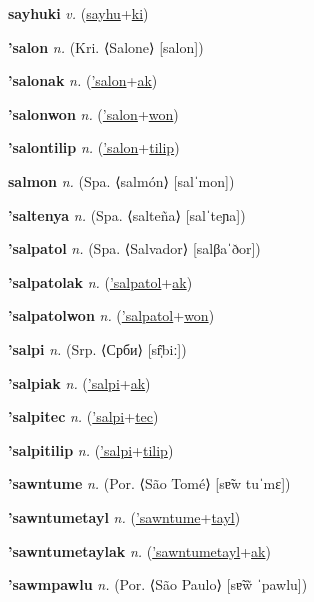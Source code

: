 \textbf{\hypertarget{sayhuki}{sayhuki}} \textit{v.} (\hyperlink{sayhu}{sayhu}+\allowbreak \hyperlink{ki}{ki})


\textbf{\hypertarget{'salon}{'salon}} \textit{n.} (Kri. ⟨Salone⟩ [salon])


\textbf{\hypertarget{'salonak}{'salonak}} \textit{n.} (\hyperlink{'salon}{'salon}+\allowbreak \hyperlink{ak}{ak})


\textbf{\hypertarget{'salonwon}{'salonwon}} \textit{n.} (\hyperlink{'salon}{'salon}+\allowbreak \hyperlink{won}{won})


\textbf{\hypertarget{'salontilip}{'salontilip}} \textit{n.} (\hyperlink{'salon}{'salon}+\allowbreak \hyperlink{tilip}{tilip})


\textbf{\hypertarget{salmon}{salmon}} \textit{n.} (Spa. ⟨salmón⟩ [salˈmon])


\textbf{\hypertarget{'saltenya}{'saltenya}} \textit{n.} (Spa. ⟨salteña⟩ [salˈteɲa])


\textbf{\hypertarget{'salpatol}{'salpatol}} \textit{n.} (Spa. ⟨Salvador⟩ [salβaˈðor])


\textbf{\hypertarget{'salpatolak}{'salpatolak}} \textit{n.} (\hyperlink{'salpatol}{'salpatol}+\allowbreak \hyperlink{ak}{ak})


\textbf{\hypertarget{'salpatolwon}{'salpatolwon}} \textit{n.} (\hyperlink{'salpatol}{'salpatol}+\allowbreak \hyperlink{won}{won})


\textbf{\hypertarget{'salpi}{'salpi}} \textit{n.} (Srp. ⟨Срби⟩ [sr̩̂biː])


\textbf{\hypertarget{'salpiak}{'salpiak}} \textit{n.} (\hyperlink{'salpi}{'salpi}+\allowbreak \hyperlink{ak}{ak})


\textbf{\hypertarget{'salpitec}{'salpitec}} \textit{n.} (\hyperlink{'salpi}{'salpi}+\allowbreak \hyperlink{tec}{tec})


\textbf{\hypertarget{'salpitilip}{'salpitilip}} \textit{n.} (\hyperlink{'salpi}{'salpi}+\allowbreak \hyperlink{tilip}{tilip})


\textbf{\hypertarget{'sawntume}{'sawntume}} \textit{n.} (Por. ⟨São Tomé⟩ [sɐ̃w tuˈmɛ])


\textbf{\hypertarget{'sawntumetayl}{'sawntumetayl}} \textit{n.} (\hyperlink{'sawntume}{'sawntume}+\allowbreak \hyperlink{tayl}{tayl})


\textbf{\hypertarget{'sawntumetaylak}{'sawntumetaylak}} \textit{n.} (\hyperlink{'sawntumetayl}{'sawntumetayl}+\allowbreak \hyperlink{ak}{ak})


\textbf{\hypertarget{'sawmpawlu}{'sawmpawlu}} \textit{n.} (Por. ⟨São Paulo⟩ [sɐ̃w̃ ˈpawlu])



